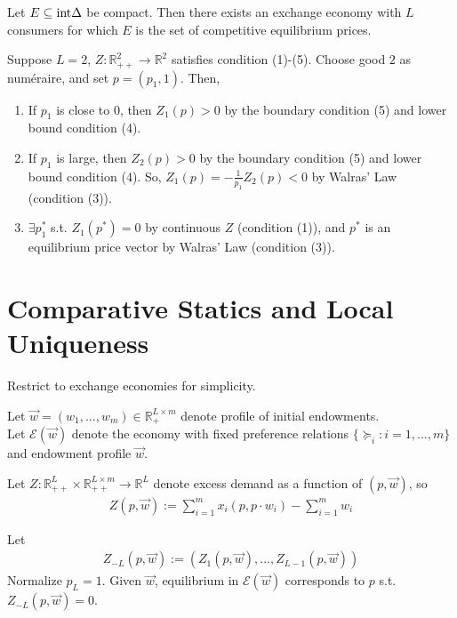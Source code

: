 \documentclass[11pt]{elegantbook}
\begin{document}
\begin{theorem}
    Let $E\subseteq \textnormal{int}\Delta$ be compact. Then there exists an exchange economy with $L$ consumers for which $E$ is the set of competitive equilibrium prices.
\end{theorem}

\begin{example}
    Suppose $L=2$, $Z: \mathbb{R}_{++}^2 \rightarrow \mathbb{R}^2$ satisfies condition (1)-(5). Choose good $2$ as numéraire, and set $p=(p_1,1)$. Then,
    \begin{enumerate}
        \item If $p_1$ is close to $0$, then $Z_1(p)>0$ by the boundary condition (5) and lower bound condition (4).
        \item If $p_1$ is large, then $Z_2(p)>0$ by the boundary condition (5) and lower bound condition (4). So, $Z_1(p)=-\frac{1}{p_1}Z_2(p)<0$ by Walras' Law (condition (3)).
        \item $\exists p_1^*$ s.t. $Z_1(p^*)=0$ by continuous $Z$ (condition (1)), and $p^*$ is an equilibrium price vector by Walras' Law (condition (3)).
    \end{enumerate}
\end{example}


\section{Comparative Statics and Local Uniqueness}
Restrict to exchange economies for simplicity.

Let $\vec{w}=(w_1,...,w_m)\in \mathbb{R}^{L\times m}_+$ denote profile of initial endowments.\\
Let $\mathcal{E}(\vec{w})$ denote the economy with fixed preference relations $\{\succeq_i:i=1,...,m\}$ and endowment profile $\vec{w}$.

Let $Z: \mathbb{R}_{++}^L\times \mathbb{R}_{++}^{L\times m} \rightarrow \mathbb{R}^L$ denote excess demand as a function of $(p,\vec{w})$, so
\begin{equation}
    \begin{aligned}
        Z(p,\vec{w}):= \sum_{i=1}^m x_i(p,p\cdot w_i)-\sum_{i=1}^m w_i
    \end{aligned}
    \nonumber
\end{equation}

Let
\begin{equation}
    \begin{aligned}
        Z_{-L}(p,\vec{w}):= \left(Z_1(p,\vec{w}),...,Z_{L-1}(p,\vec{w})\right)
    \end{aligned}
    \nonumber
\end{equation}
Normalize $p_L=1$. Given $\vec{w}$, equilibrium in $\mathcal{E}(\vec{w})$ corresponds to $p$ s.t. $Z_{-L}(p,\vec{w})=0$.
\end{document}
